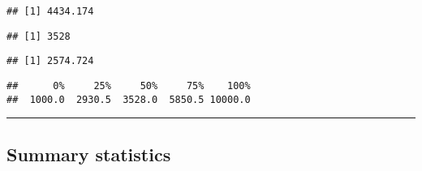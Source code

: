 \documentclass[]{article}
\newenvironment{Shaded}{\begin{snugshade}}{\end{snugshade}}
\newcommand{\KeywordTok}[1]{\textcolor[rgb]{0.13,0.29,0.53}{\textbf{#1}}}
\newcommand{\NormalTok}[1]{#1}
\newcommand{\OperatorTok}[1]{\textcolor[rgb]{0.81,0.36,0.00}{\textbf{#1}}}
\begin{document}
\begin{Shaded}
\end{Shaded}

\begin{verbatim}
## [1] 4434.174
\end{verbatim}

\begin{Shaded}
\end{Shaded}

\begin{verbatim}
## [1] 3528
\end{verbatim}

\begin{Shaded}
\end{Shaded}

\begin{verbatim}
## [1] 2574.724
\end{verbatim}

\begin{Shaded}
\end{Shaded}

\begin{verbatim}
##      0%     25%     50%     75%    100% 
##  1000.0  2930.5  3528.0  5850.5 10000.0
\end{verbatim}

\begin{center}\rule{0.5\linewidth}{\linethickness}\end{center}

\hypertarget{summary-statistics-1}{%
\subsection{Summary statistics}\label{summary-statistics-1}}
\end{document}

